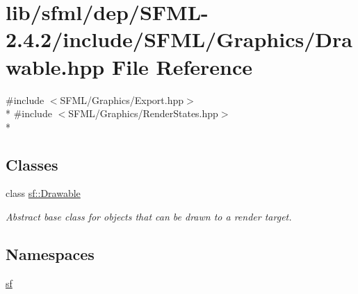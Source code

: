 \hypertarget{sfml_2dep_2_s_f_m_l-2_84_82_2include_2_s_f_m_l_2_graphics_2_drawable_8hpp}{\section{lib/sfml/dep/\-S\-F\-M\-L-\/2.4.2/include/\-S\-F\-M\-L/\-Graphics/\-Drawable.hpp File Reference}
\label{sfml_2dep_2_s_f_m_l-2_84_82_2include_2_s_f_m_l_2_graphics_2_drawable_8hpp}
}
{\ttfamily \#include $<$S\-F\-M\-L/\-Graphics/\-Export.\-hpp$>$}\\*
{\ttfamily \#include $<$S\-F\-M\-L/\-Graphics/\-Render\-States.\-hpp$>$}\\*
\subsection*{Classes}
\begin{DoxyCompactItemize}
\item 
class \hyperlink{classsf_1_1_drawable}{sf\-::\-Drawable}
\begin{DoxyCompactList}\small\item\em Abstract base class for objects that can be drawn to a render target. \end{DoxyCompactList}\end{DoxyCompactItemize}
\subsection*{Namespaces}
\begin{DoxyCompactItemize}
\item 
\hyperlink{namespacesf}{sf}
\end{DoxyCompactItemize}
